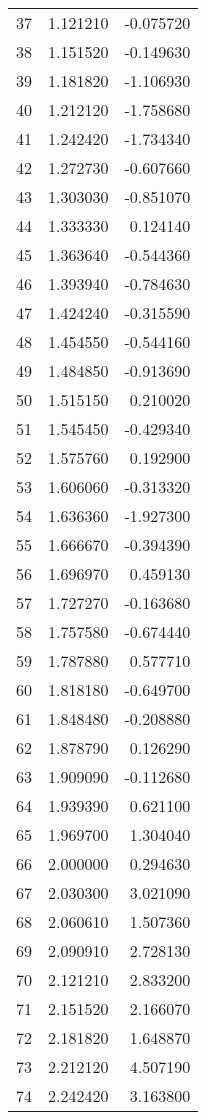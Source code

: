 \begin{tabular}{lrr}
37 & 1.121210 & -0.075720 \\
38 & 1.151520 & -0.149630 \\
39 & 1.181820 & -1.106930 \\
40 & 1.212120 & -1.758680 \\
41 & 1.242420 & -1.734340 \\
42 & 1.272730 & -0.607660 \\
43 & 1.303030 & -0.851070 \\
44 & 1.333330 & 0.124140 \\
45 & 1.363640 & -0.544360 \\
46 & 1.393940 & -0.784630 \\
47 & 1.424240 & -0.315590 \\
48 & 1.454550 & -0.544160 \\
49 & 1.484850 & -0.913690 \\
50 & 1.515150 & 0.210020 \\
51 & 1.545450 & -0.429340 \\
52 & 1.575760 & 0.192900 \\
53 & 1.606060 & -0.313320 \\
54 & 1.636360 & -1.927300 \\
55 & 1.666670 & -0.394390 \\
56 & 1.696970 & 0.459130 \\
57 & 1.727270 & -0.163680 \\
58 & 1.757580 & -0.674440 \\
59 & 1.787880 & 0.577710 \\
60 & 1.818180 & -0.649700 \\
61 & 1.848480 & -0.208880 \\
62 & 1.878790 & 0.126290 \\
63 & 1.909090 & -0.112680 \\
64 & 1.939390 & 0.621100 \\
65 & 1.969700 & 1.304040 \\
66 & 2.000000 & 0.294630 \\
67 & 2.030300 & 3.021090 \\
68 & 2.060610 & 1.507360 \\
69 & 2.090910 & 2.728130 \\
70 & 2.121210 & 2.833200 \\
71 & 2.151520 & 2.166070 \\
72 & 2.181820 & 1.648870 \\
73 & 2.212120 & 4.507190 \\
74 & 2.242420 & 3.163800 \\

\end{tabular}
